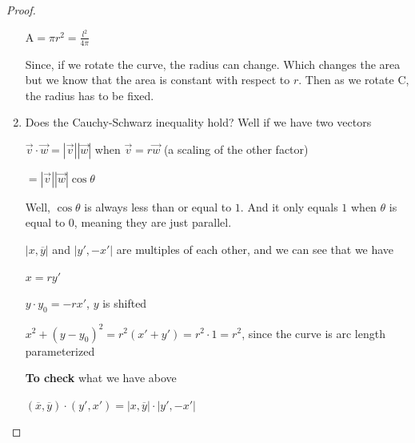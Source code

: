 \documentclass[a4paper]{book}
\numberwithin{theorem}{section}%
\begin{document}
\begin{proof}
\begin{enumerate}
\begin{center}
            $\displaystyle \mathrm{A}=\pi r^{2}=\frac{l^{2}}{4\pi}$
        \end{center}

        Since, if we rotate the curve, the radius can change. Which changes the area but we know that the area is constant with respect to $r$. Then as we rotate $\mathrm{C}$, the radius has to be fixed.

        \item Does the Cauchy-Schwarz inequality hold? Well if we have two vectors 
        \begin{center}
            $\displaystyle \overrightarrow{v}\cdot\overrightarrow{w}=|\overrightarrow{v}||\overrightarrow{w}|$ when $\overrightarrow{v}=r\overrightarrow{w}$ (a scaling of the other factor)

            $\displaystyle =|\overrightarrow{v}||\overrightarrow{w}|\cos{\theta}$
        \end{center}
        Well, $\cos{\theta}$ is always less than or equal to $1$. And it only equals $1$ when $\theta$ is equal to $0$, meaning they are just parallel.

        $\displaystyle |x,\overline{y}|$ and $\displaystyle |y',-x'|$ are multiples of each other, and we can see that we have 
        \begin{center}
            $\displaystyle x=ry'$

            $\displaystyle y\cdot y_{0}=-rx'$, $y$ is shifted

            $\displaystyle x^{2}+(y-y_{0})^{2}=r^{2}(x'+y')=r^2\cdot1=r^{2}$, since the curve is arc length parameterized
        \end{center}
        \textbf{To check} what we have above
        \begin{center}
            $\displaystyle (\overline{x},\overline{y})\cdot(y',x')=|x,\overline{y}|\cdot|y',-x'|$


\end{center}
\end{enumerate}
\end{proof}
\end{document}
